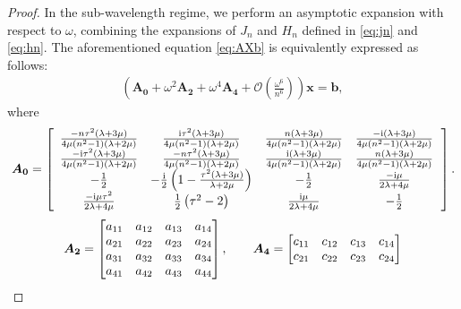 \documentclass[10pt,a4paper]{amsart}
\begin{document}
\begin{proof}
	In the sub-wavelength regime, we perform an asymptotic expansion with respect to \(\omega\), combining the expansions of \(J_n\) and \(H_n\) defined in \eqref{eq:jn} and \eqref{eq:hn}. The aforementioned equation \eqref{eq:AXb} is equivalently expressed as follows:
	\begin{align}\label{eq:xtzh}				\left(\bm{A_0}+\omega^{2}\bm{A_{2}}+\omega^{4}\bm{A_{4}}+\mathcal{O}\left(\frac{\omega^{6}}{n^{6}}\right)\right)\bm{x}=\bm{b},
	\end{align}
	where
	\begin{align}
		\left.\bm{A_0}=\left[\begin{array}{cccc}
			\frac{-n  \tau ^2 (\lambda +3 \mu )}{4 \mu  \left(n^2-1\right) (\lambda +2 \mu )} & \frac{\mathrm{i}  \tau ^2 (\lambda +3 \mu )}{4 \mu  \left(n^2-1\right) (\lambda +2 \mu )} & \frac{n  (\lambda +3 \mu )}{4 \mu  \left(n^2-1\right) (\lambda +2 \mu )} & \frac{-\mathrm{i}  (\lambda +3 \mu )}{4 \mu  \left(n^2-1\right) (\lambda +2 \mu )} \\
			\frac{-\mathrm{i}  \tau ^2 (\lambda +3 \mu )}{4 \mu  \left(n^2-1\right) (\lambda +2 \mu )} & \frac{-n  \tau ^2 (\lambda +3 \mu )}{4 \mu  \left(n^2-1\right) (\lambda +2 \mu )} & \frac{\mathrm{i}  (\lambda +3 \mu )}{4 \mu  \left(n^2-1\right) (\lambda +2 \mu )} & \frac{n  (\lambda +3 \mu )}{4 \mu  \left(n^2-1\right) (\lambda +2 \mu )} \\
			-\frac{1}{2} & -\frac{\mathrm{i}}{2}  \left(1-\frac{\tau ^2 (\lambda +3 \mu )}{\lambda +2 \mu }\right) & -\frac{1}{2} & \frac{-\mathrm{i} \mu }{2 \lambda +4 \mu } \\
			\frac{-\mathrm{i} \mu  \tau ^2}{2 \lambda +4 \mu } & \frac{1}{2} \left(\tau ^2-2\right) & \frac{\mathrm{i} \mu }{2 \lambda +4 \mu } & -\frac{1}{2} \\
		\end{array}\right.\right].\notag
	\end{align}
	\iffalse
	\begin{align}\notag
		\bm{A_{2}}=\begin{bmatrix}
			a_{11} & a_{12} & a_{13}& a_{14} \\
			a_{21} & a_{22} & a_{23}& a_{24} \\
			a_{31} & a_{32} & a_{33}& a_{34}\\
			a_{41} & a_{42} & a_{43}& a_{44}
		\end{bmatrix},\quad\quad
		\bm{A_{4}}=\begin{bmatrix}
			c_{11} & c_{12} & c_{13}& c_{14} \\
			c_{21} & c_{22} & c_{23}& c_{24} \\

\end{bmatrix}
\end{align}
\end{proof}
\end{document}
